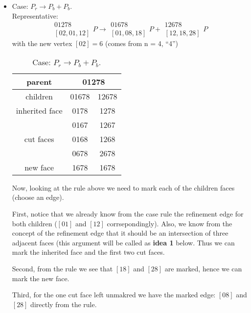 \documentclass[a4paper,12pt]{amsart}
\numberwithin{equation}{section}
\begin{document}
\begin{itemize}
	\item Case: $P_r \rightarrow P_b + P_b$. \\
	Representative: 
	$$ \begin{array}{c} 01278 \\ \left[02,01,12\right] \end{array} P
	\rightarrow 
	\begin{array}{c} 01678 \\ \left[01,08,18\right] \end{array} P +
	\begin{array}{c} 12678 \\ \left[12,18,28\right] \end{array} P $$
	with the new vertex $\left[02\right] = 6$ (comes from n = 4, ``4'')
	
	\begin{table}[h!]
	\caption{Case: $P_r \rightarrow P_b + P_b$.}
	\label{tab:Case1}
	\begin{tabular}{|c|c|c|} \hline
	parent & \multicolumn{2}{|c|}{01278} \\ \hline
	children & 01678 & 12678 \\ \hline
	inherited face & 0178 & 1278 \\ \hline
	\multirow{3}{*}{cut faces} & 0167 & 1267 \\ 
	 & 0168 & 1268 \\ 
	 & 0678 & 2678 \\ \hline
	 new face & 1678 & 1678 \\ \hline
	\end{tabular}
	\end{table}
    Now, looking at the rule above we need to mark each of the children faces (choose an edge). 
    
    First, notice that we already know from the case rule the refinement edge for both children ($\left[01\right]$ and $\left[12\right]$ corrsepondingly). Also, we know from the concept of the refinement edge that it should be an intersection of three adjacent faces (this argument will be called as \textbf{idea 1} below. Thus we can mark the inherited face and the first two cut faces.
    
    Second, from the rule we see that $\left[18\right]$ and $\left[28\right]$ are marked, hence we can mark the new face.
    
    Third, for the one cut face left unmakred we have the marked edge: $\left[08\right]$ and $\left[28\right]$ directly from the rule.
      

\end{itemize}
\end{document}
